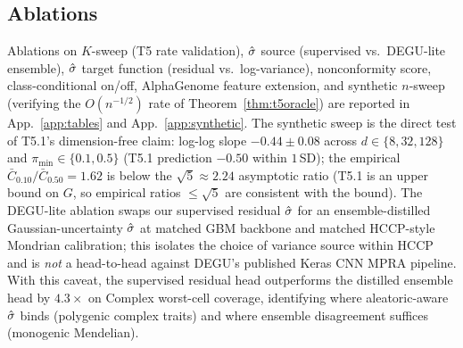 \subsection{Ablations}

Ablations on $K$-sweep (T5 rate validation), $\hat{\sigma}$ source (supervised vs.\ DEGU-lite ensemble), $\hat{\sigma}$ target function (residual vs.\ log-variance), nonconformity score, class-conditional on/off, AlphaGenome \citep{avsec2026alphagenome} feature extension, and synthetic $n$-sweep (verifying the $O(n^{-1/2})$ rate of Theorem~\ref{thm:t5oracle}) are reported in App.~\ref{app:tables} and App.~\ref{app:synthetic}. The synthetic sweep is the direct test of T5.1's dimension-free claim: log-log slope $-0.44 \pm 0.08$ across $d \in \{8, 32, 128\}$ and $\pi_{\min} \in \{0.1, 0.5\}$ (T5.1 prediction $-0.50$ within $1$\,SD); the empirical $\bar C_{0.10} / \bar C_{0.50} = 1.62$ is below the $\sqrt{5} \approx 2.24$ asymptotic ratio (T5.1 is an upper bound on $G$, so empirical ratios $\leq \sqrt{5}$ are consistent with the bound). The DEGU-lite ablation \citep{zhou2026degu} swaps our supervised residual $\hat{\sigma}$ for an ensemble-distilled Gaussian-uncertainty $\hat{\sigma}$ at matched GBM backbone and matched HCCP-style Mondrian calibration; this isolates the choice of variance source within HCCP and is \emph{not} a head-to-head against DEGU's published Keras CNN MPRA pipeline. With this caveat, the supervised residual head outperforms the distilled ensemble head by $4.3\times$ on Complex worst-cell coverage, identifying where aleatoric-aware $\hat{\sigma}$ binds (polygenic complex traits) and where ensemble disagreement suffices (monogenic Mendelian).

